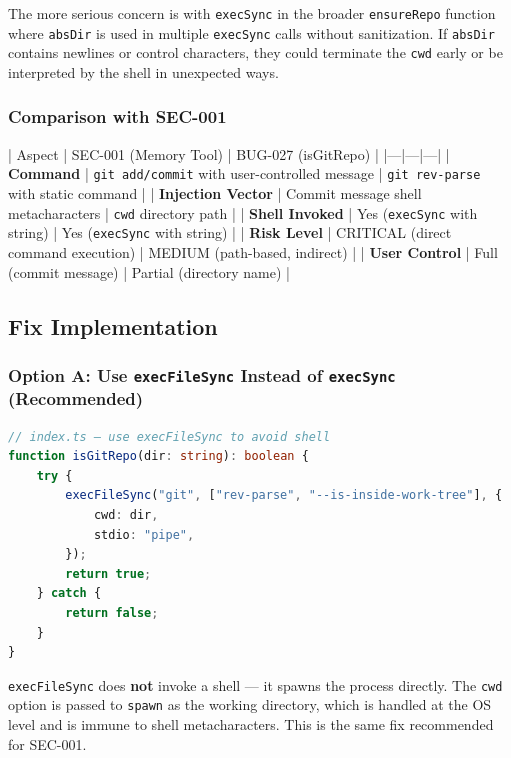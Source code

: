 The more serious concern is with \texttt{execSync} in the broader \texttt{ensureRepo} function where \texttt{absDir} is used in multiple \texttt{execSync} calls without sanitization. If \texttt{absDir} contains newlines or control characters, they could terminate the \texttt{cwd} early or be interpreted by the shell in unexpected ways.

\subsubsection*{Comparison with SEC-001}

| Aspect | SEC-001 (Memory Tool) | BUG-027 (isGitRepo) |
|---|---|---|
| \textbf{Command} | \texttt{git add/commit} with user-controlled message | \texttt{git rev-parse} with static command |
| \textbf{Injection Vector} | Commit message shell metacharacters | \texttt{cwd} directory path |
| \textbf{Shell Invoked} | Yes (\texttt{execSync} with string) | Yes (\texttt{execSync} with string) |
| \textbf{Risk Level} | CRITICAL (direct command execution) | MEDIUM (path-based, indirect) |
| \textbf{User Control} | Full (commit message) | Partial (directory name) |


\subsection*{Fix Implementation}
\subsubsection*{Option A: Use \texttt{execFileSync} Instead of \texttt{execSync} (Recommended)}



\begin{lstlisting}[language=TypeScript]
// index.ts — use execFileSync to avoid shell
function isGitRepo(dir: string): boolean {
    try {
        execFileSync("git", ["rev-parse", "--is-inside-work-tree"], {
            cwd: dir,
            stdio: "pipe",
        });
        return true;
    } catch {
        return false;
    }
}

\end{lstlisting}



\texttt{execFileSync} does \textbf{not} invoke a shell — it spawns the process directly. The \texttt{cwd} option is passed to \texttt{spawn} as the working directory, which is handled at the OS level and is immune to shell metacharacters. This is the same fix recommended for SEC-001.

